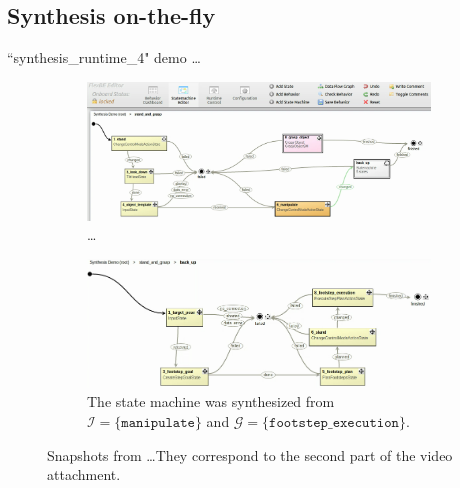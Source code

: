 
\subsection{Synthesis on-the-fly}

``synthesis\_runtime\_4" demo \ldots

\begin{figure}[t]
	\centering
	\begin{subfigure}[b]{0.99\columnwidth}
	\includegraphics[width=0.99\columnwidth, clip]{./img/synthesis_runtime_connect_sm.png}
	\caption{\ldots
	} 
	\label{Fig:runtime1}
	\end{subfigure}
	
	\vspace{4 pt}
	\begin{subfigure}[b]{0.99\columnwidth}
	\includegraphics[width=0.99\columnwidth, clip]{./img/synthesis_runtime_synthesized_sm.png}
	\caption{The state machine was synthesized from $\mathcal{I} = \{ \mathtt{manipulate} \}$ and $\mathcal{G} = \{ \mathtt{footstep\_execution} \}$.
	} 
	\label{Fig:runtime2}
	\end{subfigure}
	\caption{Snapshots from \ldots They correspond to the second part of the video attachment.
	}
	\label{Fig:synthesis_runtime_demo}
\end{figure}

